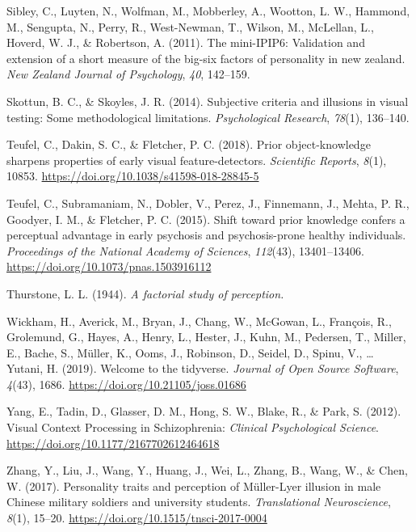\documentclass[
  man,floatsintext]{apa6}
\newlength{\cslhangindent}
\newlength{\cslentryspacingunit} %
\newenvironment{CSLReferences}[2] %
 {%
  \setlength{\parindent}{0pt}
  \ifodd #1
  \let\oldpar\par
  \def\par{\hangindent=\cslhangindent\oldpar}
  \fi
  \setlength{\parskip}{#2\cslentryspacingunit}
 }%
 {}
\begin{document}
\begin{CSLReferences}{1}{0}
\leavevmode{}%
Sibley, C., Luyten, N., Wolfman, M., Mobberley, A., Wootton, L. W., Hammond, M., Sengupta, N., Perry, R., West-Newman, T., Wilson, M., McLellan, L., Hoverd, W. J., \& Robertson, A. (2011). The mini-IPIP6: Validation and extension of a short measure of the big-six factors of personality in new zealand. \emph{New Zealand Journal of Psychology}, \emph{40}, 142--159.

\leavevmode{}%
Skottun, B. C., \& Skoyles, J. R. (2014). Subjective criteria and illusions in visual testing: Some methodological limitations. \emph{Psychological Research}, \emph{78}(1), 136--140.

\leavevmode{}%
Teufel, C., Dakin, S. C., \& Fletcher, P. C. (2018). Prior object-knowledge sharpens properties of early visual feature-detectors. \emph{Scientific Reports}, \emph{8}(1), 10853. \url{https://doi.org/10.1038/s41598-018-28845-5}

\leavevmode{}%
Teufel, C., Subramaniam, N., Dobler, V., Perez, J., Finnemann, J., Mehta, P. R., Goodyer, I. M., \& Fletcher, P. C. (2015). Shift toward prior knowledge confers a perceptual advantage in early psychosis and psychosis-prone healthy individuals. \emph{Proceedings of the National Academy of Sciences}, \emph{112}(43), 13401--13406. \url{https://doi.org/10.1073/pnas.1503916112}

\leavevmode{}%
Thurstone, L. L. (1944). \emph{A factorial study of perception.}

\leavevmode{}%
Wickham, H., Averick, M., Bryan, J., Chang, W., McGowan, L., François, R., Grolemund, G., Hayes, A., Henry, L., Hester, J., Kuhn, M., Pedersen, T., Miller, E., Bache, S., Müller, K., Ooms, J., Robinson, D., Seidel, D., Spinu, V., \ldots{} Yutani, H. (2019). Welcome to the tidyverse. \emph{Journal of Open Source Software}, \emph{4}(43), 1686. \url{https://doi.org/10.21105/joss.01686}

\leavevmode{}%
Yang, E., Tadin, D., Glasser, D. M., Hong, S. W., Blake, R., \& Park, S. (2012). Visual Context Processing in Schizophrenia: \emph{Clinical Psychological Science}. \url{https://doi.org/10.1177/2167702612464618}

\leavevmode{}%
Zhang, Y., Liu, J., Wang, Y., Huang, J., Wei, L., Zhang, B., Wang, W., \& Chen, W. (2017). Personality traits and perception of Müller-Lyer illusion in male Chinese military soldiers and university students. \emph{Translational Neuroscience}, \emph{8}(1), 15--20. \url{https://doi.org/10.1515/tnsci-2017-0004}

\end{CSLReferences}


\clearpage
\renewcommand{\listfigurename}{Figure captions}
\end{document}
